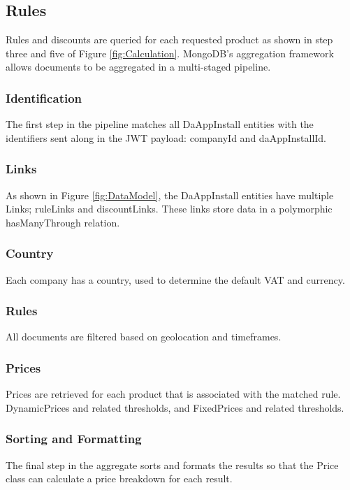 %
\subsection{Rules}
Rules and discounts are queried for each requested product as shown in step three and five of Figure \ref{fig:Calculation}. MongoDB’s aggregation framework allows documents to be aggregated in a multi-staged pipeline.

\subsubsection{Identification}
The first step in the pipeline matches all DaAppInstall entities with the identifiers sent along in the JWT payload: companyId and daAppInstallId.
\subsubsection{Links}
As shown in Figure \ref{fig:DataModel}, the DaAppInstall entities have multiple Links; ruleLinks and discountLinks. These links store data in a polymorphic hasManyThrough relation.
\subsubsection{Country}
Each company has a country, used to determine the default VAT and currency.
\subsubsection{Rules}
All documents are filtered based on geolocation and timeframes.
\subsubsection{Prices}
Prices are retrieved for each product that is associated with the matched rule. DynamicPrices and related thresholds, and FixedPrices and related thresholds.
\subsubsection{Sorting and Formatting}
The final step in the aggregate sorts and formats the results so that the Price class can calculate a price breakdown for each result.

%
